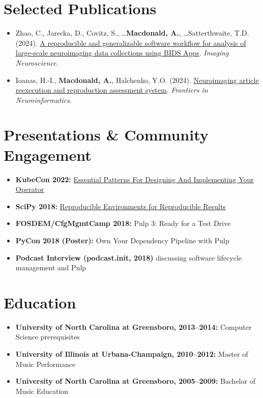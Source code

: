\documentclass[11pt,letterpaper]{article}
\begin{document}
\section{Selected Publications}

\begin{itemize}
  \item Zhao, C., Jarecka, D., Covitz, S., \ldots \textbf{Macdonald, A.}, \ldots Satterthwaite, T.D. (2024). \href{https://doi.org/10.1162/imag_a_00074}{A reproducible and generalizable software workflow for analysis of large-scale neuroimaging data collections using BIDS Apps}. \textit{Imaging Neuroscience}.
  \item Ioanas, H.-I., \textbf{Macdonald, A.}, Halchenko, Y.O. (2024). \href{https://doi.org/10.3389/fninf.2024.1376022}{Neuroimaging article reexecution and reproduction assessment system}. \textit{Frontiers in Neuroinformatics}.
\end{itemize}

\section{Presentations \& Community Engagement}

\begin{itemize}
  \item \textbf{KubeCon 2022:} \href{https://www.youtube.com/watch?v=_SCzRtU5RRA}{Essential Patterns For Designing And Implementing Your Operator}
  \item \textbf{SciPy 2018:} \href{https://www.youtube.com/watch?v=5czGgUG0oXA}{Reproducible Environments for Reproducible Results}
  \item \textbf{FOSDEM/CfgMgmtCamp 2018:} Pulp 3: Ready for a Test Drive
  \item \textbf{PyCon 2018 (Poster):} Own Your Dependency Pipeline with Pulp
  \item \textbf{Podcast Interview (podcast.init, 2018)} discussing software lifecycle management and Pulp
\end{itemize}

\section{Education}

\begin{itemize}
  \item \textbf{University of North Carolina at Greensboro, 2013--2014:} Computer Science prerequisites
  \item \textbf{University of Illinois at Urbana-Champaign, 2010--2012:} Master of Music Performance
  \item \textbf{University of North Carolina at Greensboro, 2005--2009:} Bachelor of Music Education
\end{itemize}
\end{document}
